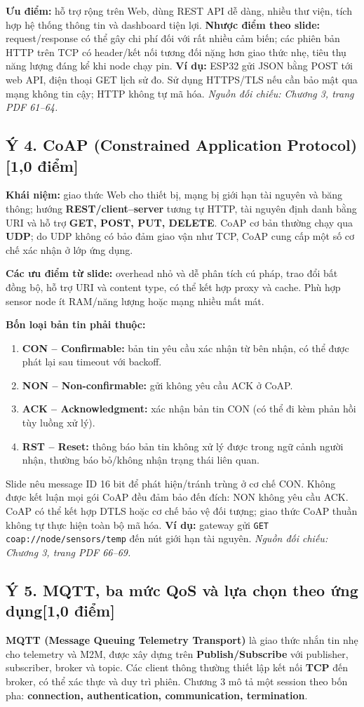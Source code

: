 \documentclass[12pt,a4paper]{article}
\newcommand{\muc}[1]{\subsection*{#1\hfill{\color{teal}\normalsize [1,0 điểm]}}}
\newcommand{\nguon}[1]{{\small\itshape\color{navy}Nguồn đối chiếu: #1.}}
\begin{document}
\textbf{Ưu điểm:} hỗ trợ rộng trên Web, dùng REST API dễ dàng, nhiều thư viện, tích hợp hệ thống thông tin và dashboard tiện lợi. \textbf{Nhược điểm theo slide:} request/response có thể gây chi phí đối với rất nhiều cảm biến; các phiên bản HTTP trên TCP có header/kết nối tương đối nặng hơn giao thức nhẹ, tiêu thụ năng lượng đáng kể khi node chạy pin. \textbf{Ví dụ:} ESP32 gửi JSON bằng POST tới web API, điện thoại GET lịch sử đo. Sử dụng HTTPS/TLS nếu cần bảo mật qua mạng không tin cậy; HTTP không tự mã hóa. \nguon{Chương 3, trang PDF 61--64}

\muc{Ý 4. CoAP (Constrained Application Protocol)}
\textbf{Khái niệm:} giao thức Web cho thiết bị, mạng bị giới hạn tài nguyên và băng thông; hướng \textbf{REST/client--server} tương tự HTTP, tài nguyên định danh bằng URI và hỗ trợ \textbf{GET, POST, PUT, DELETE}. CoAP cơ bản thường chạy qua \textbf{UDP}; do UDP không có bảo đảm giao vận như TCP, CoAP cung cấp một số cơ chế xác nhận ở lớp ứng dụng.

\textbf{Các ưu điểm từ slide:} overhead nhỏ và dễ phân tích cú pháp, trao đổi bất đồng bộ, hỗ trợ URI và content type, có thể kết hợp proxy và cache. Phù hợp sensor node ít RAM/năng lượng hoặc mạng nhiều mất mát.

\textbf{Bốn loại bản tin phải thuộc:}
\begin{enumerate}
\item \textbf{CON -- Confirmable:} bản tin yêu cầu xác nhận từ bên nhận, có thể được phát lại sau timeout với backoff.
\item \textbf{NON -- Non-confirmable:} gửi không yêu cầu ACK ở CoAP.
\item \textbf{ACK -- Acknowledgment:} xác nhận bản tin CON (có thể đi kèm phản hồi tùy luồng xử lý).
\item \textbf{RST -- Reset:} thông báo bản tin không xử lý được trong ngữ cảnh người nhận, thường báo bỏ/không nhận trạng thái liên quan.
\end{enumerate}
Slide nêu message ID 16 bit để phát hiện/tránh trùng ở cơ chế CON. Không được kết luận mọi gói CoAP đều đảm bảo đến đích: NON không yêu cầu ACK. CoAP có thể kết hợp DTLS hoặc cơ chế bảo vệ đối tượng; giao thức CoAP thuần không tự thực hiện toàn bộ mã hóa. \textbf{Ví dụ:} gateway gửi \texttt{GET coap://node/sensors/temp} đến nút giới hạn tài nguyên. \nguon{Chương 3, trang PDF 66--69}

\muc{Ý 5. MQTT, ba mức QoS và lựa chọn theo ứng dụng}
\textbf{MQTT (Message Queuing Telemetry Transport)} là giao thức nhắn tin nhẹ cho telemetry và M2M, được xây dựng trên \textbf{Publish/Subscribe} với publisher, subscriber, broker và topic. Các client thông thường thiết lập kết nối \textbf{TCP} đến broker, có thể xác thực và duy trì phiên. Chương 3 mô tả một session theo bốn pha: \textbf{connection, authentication, communication, termination}.
\end{document}
